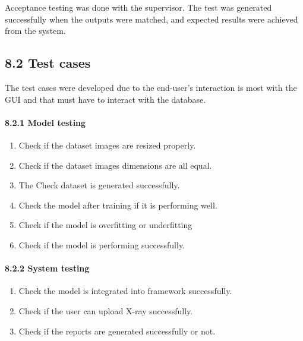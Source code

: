 \documentclass{article} %
\begin{document}
\noindent Acceptance testing was done with the supervisor. The test was generated successfully when the outputs were matched, and expected results were achieved from the system.

\noindent 
\subsection{8.2 Test cases}

\noindent The test cases were developed due to the end-user's interaction is most with the GUI and that must have to interact with the database.

\noindent 
\paragraph{8.2.1 Model testing}

\begin{enumerate}
\item \textbf{ }Check if the dataset images are resized properly.

\item  Check if the dataset images dimensions are all equal.

\item  The Check dataset is generated successfully.

\item  Check the model after training if it is performing well.

\item  Check if the model is overfitting or underfitting

\item  Check if the model is performing successfully.
\end{enumerate}

\noindent 
\paragraph{8.2.2 System testing}

\begin{enumerate}
\item \textbf{ }Check the model is integrated into framework successfully.

\item  Check if the user can upload X-ray successfully.

\item  Check if the reports are generated successfully or not.
\end{enumerate}
\end{document}
